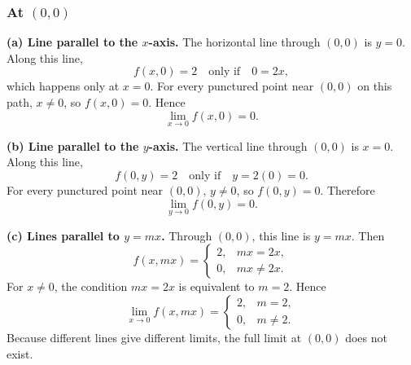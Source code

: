 \documentclass[11pt]{article}
\begin{document}
\begin{center}
\end{center}

\subsubsection*{At \((0,0)\)}

\textbf{(a) Line parallel to the \(x\)-axis.} The horizontal line through \((0,0)\) is \(y=0\). Along this line,
\[
f(x,0)=2 \quad\text{only if}\quad 0=2x,
\]
which happens only at \(x=0\). For every punctured point near \((0,0)\) on this path, \(x\neq0\), so \(f(x,0)=0\). Hence
\[
\lim_{x\to0} f(x,0)=0.
\]

\textbf{(b) Line parallel to the \(y\)-axis.} The vertical line through \((0,0)\) is \(x=0\). Along this line,
\[
f(0,y)=2 \quad\text{only if}\quad y=2(0)=0.
\]
For every punctured point near \((0,0)\), \(y\neq0\), so \(f(0,y)=0\). Therefore
\[
\lim_{y\to0} f(0,y)=0.
\]

\textbf{(c) Lines parallel to \(y=mx\).} Through \((0,0)\), this line is \(y=mx\). Then
\[
f(x,mx)=
\begin{cases}
2,& mx=2x,\\
0,& mx\neq2x.
\end{cases}
\]
For \(x\neq0\), the condition \(mx=2x\) is equivalent to \(m=2\). Hence
\[
\lim_{x\to0}f(x,mx)=
\begin{cases}
2,&m=2,\\
0,&m\neq2.
\end{cases}
\]
Because different lines give different limits, the full limit at \((0,0)\) does not exist.
\end{document}
